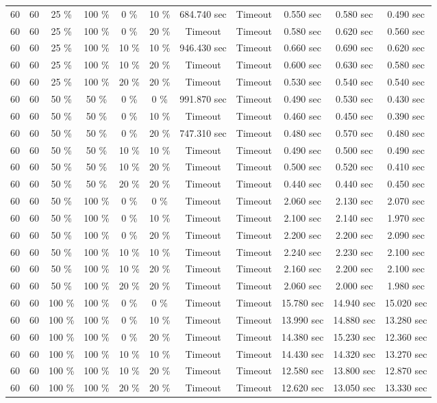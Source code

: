 \documentclass{article}
\begin{document}
\begin{longtable}[]{@{}ccccccccccc@{}}
60 & 60 & 25 \% & 100 \% & 0 \% & 10 \% & 684.740 sec & Timeout & 0.550 sec & 0.580 sec & 0.490 sec \\
60 & 60 & 25 \% & 100 \% & 0 \% & 20 \% & Timeout & Timeout & 0.580 sec & 0.620 sec & 0.560 sec \\
60 & 60 & 25 \% & 100 \% & 10 \% & 10 \% & 946.430 sec & Timeout & 0.660 sec & 0.690 sec & 0.620 sec \\
60 & 60 & 25 \% & 100 \% & 10 \% & 20 \% & Timeout & Timeout & 0.600 sec & 0.630 sec & 0.580 sec \\
60 & 60 & 25 \% & 100 \% & 20 \% & 20 \% & Timeout & Timeout & 0.530 sec & 0.540 sec & 0.540 sec \\
60 & 60 & 50 \% & 50 \% & 0 \% & 0 \% & 991.870 sec & Timeout & 0.490 sec & 0.530 sec & 0.430 sec \\
60 & 60 & 50 \% & 50 \% & 0 \% & 10 \% & Timeout & Timeout & 0.460 sec & 0.450 sec & 0.390 sec \\
60 & 60 & 50 \% & 50 \% & 0 \% & 20 \% & 747.310 sec & Timeout & 0.480 sec & 0.570 sec & 0.480 sec \\
60 & 60 & 50 \% & 50 \% & 10 \% & 10 \% & Timeout & Timeout & 0.490 sec & 0.500 sec & 0.490 sec \\
60 & 60 & 50 \% & 50 \% & 10 \% & 20 \% & Timeout & Timeout & 0.500 sec & 0.520 sec & 0.410 sec \\
60 & 60 & 50 \% & 50 \% & 20 \% & 20 \% & Timeout & Timeout & 0.440 sec & 0.440 sec & 0.450 sec \\
60 & 60 & 50 \% & 100 \% & 0 \% & 0 \% & Timeout & Timeout & 2.060 sec & 2.130 sec & 2.070 sec \\
60 & 60 & 50 \% & 100 \% & 0 \% & 10 \% & Timeout & Timeout & 2.100 sec & 2.140 sec & 1.970 sec \\
60 & 60 & 50 \% & 100 \% & 0 \% & 20 \% & Timeout & Timeout & 2.200 sec & 2.200 sec & 2.090 sec \\
60 & 60 & 50 \% & 100 \% & 10 \% & 10 \% & Timeout & Timeout & 2.240 sec & 2.230 sec & 2.100 sec \\
60 & 60 & 50 \% & 100 \% & 10 \% & 20 \% & Timeout & Timeout & 2.160 sec & 2.200 sec & 2.100 sec \\
60 & 60 & 50 \% & 100 \% & 20 \% & 20 \% & Timeout & Timeout & 2.060 sec & 2.000 sec & 1.980 sec \\
60 & 60 & 100 \% & 100 \% & 0 \% & 0 \% & Timeout & Timeout & 15.780 sec & 14.940 sec & 15.020 sec \\
60 & 60 & 100 \% & 100 \% & 0 \% & 10 \% & Timeout & Timeout & 13.990 sec & 14.880 sec & 13.280 sec \\
60 & 60 & 100 \% & 100 \% & 0 \% & 20 \% & Timeout & Timeout & 14.380 sec & 15.230 sec & 12.360 sec \\
60 & 60 & 100 \% & 100 \% & 10 \% & 10 \% & Timeout & Timeout & 14.430 sec & 14.320 sec & 13.270 sec \\
60 & 60 & 100 \% & 100 \% & 10 \% & 20 \% & Timeout & Timeout & 12.580 sec & 13.800 sec & 12.870 sec \\
60 & 60 & 100 \% & 100 \% & 20 \% & 20 \% & Timeout & Timeout & 12.620 sec & 13.050 sec & 13.330 sec \\* \bottomrule
\end{longtable}
\end{document}
